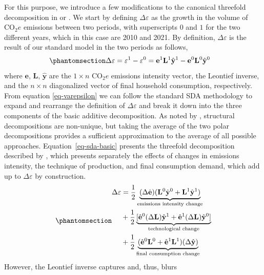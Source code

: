 \documentclass[
  10pt,
  twocolumn]{aft}
\begin{document}
For this purpose, we introduce a few modifications to the canonical
threefold decomposition in \citet[sec.~13.1.5]{miller_input-output_2022}
or \citet{dietzenbacherStructuralDecompositionTechniques1998}. We start
by defining \(\Delta \varepsilon\) as the growth in the volume of
\(\text{CO}_2e\) emissions between two periods, with superscripts \(0\)
and \(1\) for the two different years, which in this case are 2010 and
2021. By definition, \(\Delta \varepsilon\) is the result of our
standard model in the two periods as follows, \vspace{-3pt}
\begin{equation}\phantomsection\label{eq-varepsilon}{
\begin{aligned}
\Delta \varepsilon &= \varepsilon^1 -\varepsilon^0=\mathbf{e}^1\mathbf{L}^1\hat{\mathbf{y}}^1 - \mathbf{e}^0\mathbf{L}^0\hat{\mathbf{y}}^0
\end{aligned}
}\end{equation} where \(\mathbf{e}\), \(\mathbf{L}\),
\(\hat{\mathbf{y}}\) are the \(1 \times n\) \(\text{CO}_2e\) emissions
intensity vector, the Leontief inverse, and the \(n \times n\)
diagonalized vector of final household consumption, respectively. From
equation \ref{eq-varepsilon} we can follow the standard SDA methodology
\citep[sec.~13.1.1 to
13.1.5]{dietzenbacherStructuralDecompositionTechniques1998, miller_input-output_2022}
to expand and rearrange the definition of \(\Delta \varepsilon\) and
break it down into the three components of the basic additive
decomposition. As noted by
\citet[p.~310]{dietzenbacherStructuralDecompositionTechniques1998},
structural decompositions are non-unique, but taking the average of the
two polar decompositions provides a sufficient approximation to the
average of all possible approaches. Equation~\ref{eq-sda-basic} presents
the threefold decomposition described by
\citet[13.1.5]{miller_input-output_2022}, which presents separately the
effects of changes in emissions intensity, the technique of production,
and final consumption demand, which add up to \(\Delta \varepsilon\) by
construction. \vspace{-3pt}
\begin{equation}\phantomsection\label{eq-sda-basic}{
\begin{aligned}
\Delta \varepsilon&= \frac{1}{2}\underbrace{(\Delta \hat{\mathbf{e}})(\mathbf{L}^0\hat{\mathbf{y}}^0 + \mathbf{L}^1\hat{\mathbf{y}}^1)}_{\text{emissions intensity change}} \\ 
& + \frac{1}{2}\underbrace{\lbrack\hat{\mathbf{e}}^0(\Delta \mathbf{L})\hat{\mathbf{y}}^1 + \hat{\mathbf{e}}^1(\Delta \mathbf{L})\hat{\mathbf{y}}^0\rbrack}_{\text{technological change}} \\
& + \frac{1}{2}\underbrace{(\hat{\mathbf{e}}^0\mathbf{L}^0 + \hat{\mathbf{e}}^1\mathbf{L}^1)(\Delta \hat{\mathbf{y}})}_{\text{final consumption change}}
\end{aligned}
}\end{equation} However, the Leontief inverse captures and, thus, blurs
\end{document}
